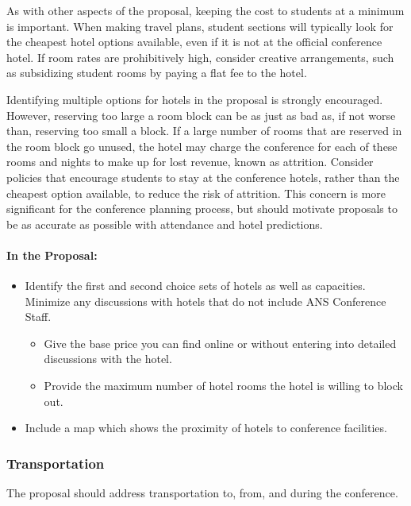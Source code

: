 \documentclass[12pt]{article}
\begin{document}
As with other aspects of the proposal, keeping the cost to students at a minimum is important. When making travel plans, student sections will typically look for the cheapest hotel options available, even if it is not at the official conference hotel. If room rates are prohibitively high, consider creative arrangements, such as subsidizing student rooms by paying a flat fee to the hotel.

Identifying multiple options for hotels in the proposal is strongly encouraged. However, reserving too large a room block can be as just as bad as, if not worse than, reserving too small a block. If a large number of rooms that are reserved in the room block go unused, the hotel may charge the conference for each of these rooms and nights to make up for lost revenue, known as attrition. Consider policies that encourage students to stay at the conference hotels, rather than the cheapest option available, to reduce the risk of attrition. This concern is more significant for the conference planning process, but should motivate proposals to be as accurate as possible with attendance and hotel predictions.

\paragraph{In the Proposal:}
\begin{itemize}
    \item{Identify the first and second choice sets of hotels as well as capacities. Minimize any discussions with hotels that do not include ANS Conference Staff.
    \begin{itemize}
        \item{Give the base price you can find online or without entering into detailed discussions with the hotel.}
        \item{Provide the maximum number of hotel rooms the hotel is willing to block out.}
    \end{itemize}}
    \item{Include a map which shows the proximity of hotels to conference facilities.}
\end{itemize}

\subsubsection{Transportation}

The proposal should address transportation to, from, and during the conference.
\end{document}
